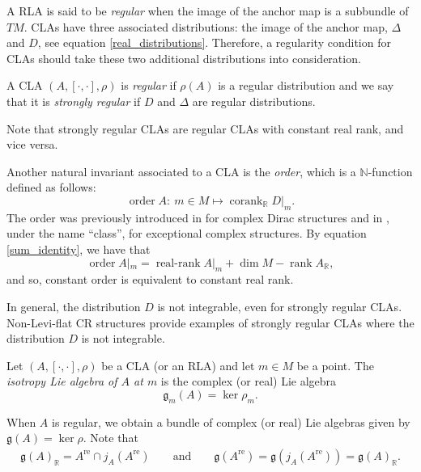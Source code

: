 \documentclass[pdftex]{sigma}
\numberwithin{equation}{section}
\newcommand{\R}{{\mathbb{R}}}
\newcommand{\g}{\mathfrak{g}}
\DeclareMathOperator{\order}{order}
\DeclareMathOperator{\rk}{rank}
\DeclareMathOperator{\cork}{corank}
\DeclareMathOperator{\real}{re}
\DeclareMathOperator{\rerk}{real-rank}
\begin{document}
 A RLA is said to be {\em regular} when the image of the anchor map is a subbundle of $TM$. CLAs have three associated distributions: the image of the anchor map, $\Delta$ and $D$, see equation \eqref{real_distributions}. Therefore, a regularity condition for CLAs should take these two additional distributions into consideration.
 \begin{Definition}
 A CLA $(A,[\cdot,\cdot], \rho)$ is {\em regular} if $\rho(A)$ is a regular distribution and we say that it is {\em strongly regular} if $D$ and $\Delta$ are regular distributions.
\end{Definition}
 Note that strongly regular CLAs are regular CLAs with constant real rank, and vice versa.
\begin{Remark}
 Another natural invariant associated to a CLA is the {\em order}, which is a $\mathbb{N}$-function defined as follows:
 \[\order A\colon \ m\in M\mapsto \cork_{\R} D|_{m}.\]
The order was previously introduced in \cite{aguero2022complex} for complex Dirac structures and in \cite{tennyson2021exceptional}, under the name ``class'', for exceptional complex structures.
By equation \eqref{sum_identity}, we have that
\begin{equation}\label{orderrr}
\order A|_m=\rerk A|_m+\dim M-\rk A_{\R},
\end{equation}
and so, constant order is equivalent to constant real rank.
\end{Remark}

In general, the distribution $D$ is not integrable, even for strongly regular CLAs. Non-Levi-flat CR structures provide examples of strongly regular CLAs where the distribution $D$ is not integrable.
\begin{Definition}
Let $(A, [\cdot,\cdot], \rho)$ be a CLA (or an RLA) and let $m\in M$ be a point. The {\em isotropy Lie algebra of $A$ at $m$} is the complex (or real) Lie algebra
\[\g_m (A)=\ker\rho_m.\]
\end{Definition}
When $A$ is regular, we obtain a bundle of complex (or real) Lie algebras given by $\g(A)=\ker \rho$.
 Note that
 \begin{align*}
  \g(A)_{\R}= A^{\real}\cap j_A(A^{\real}) \qquad \text{and}\qquad
\g(A^{\real})=\g(j_A(A^{\real}))=\g(A)_{\R}.
   \end{align*}
\end{document}
